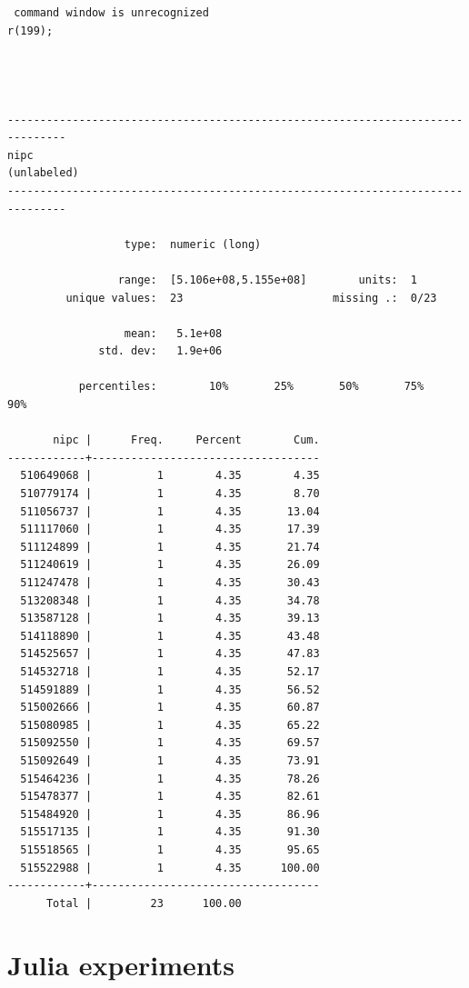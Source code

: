 \documentclass[
  12pt,
]{article}
\begin{document}
\begin{verbatim}
 command window is unrecognized
r(199);




-------------------------------------------------------------------------------
nipc                                                                (unlabeled)
-------------------------------------------------------------------------------

                  type:  numeric (long)

                 range:  [5.106e+08,5.155e+08]        units:  1
         unique values:  23                       missing .:  0/23

                  mean:   5.1e+08
              std. dev:   1.9e+06

           percentiles:        10%       25%       50%       75%       90%

       nipc |      Freq.     Percent        Cum.
------------+-----------------------------------
  510649068 |          1        4.35        4.35
  510779174 |          1        4.35        8.70
  511056737 |          1        4.35       13.04
  511117060 |          1        4.35       17.39
  511124899 |          1        4.35       21.74
  511240619 |          1        4.35       26.09
  511247478 |          1        4.35       30.43
  513208348 |          1        4.35       34.78
  513587128 |          1        4.35       39.13
  514118890 |          1        4.35       43.48
  514525657 |          1        4.35       47.83
  514532718 |          1        4.35       52.17
  514591889 |          1        4.35       56.52
  515002666 |          1        4.35       60.87
  515080985 |          1        4.35       65.22
  515092550 |          1        4.35       69.57
  515092649 |          1        4.35       73.91
  515464236 |          1        4.35       78.26
  515478377 |          1        4.35       82.61
  515484920 |          1        4.35       86.96
  515517135 |          1        4.35       91.30
  515518565 |          1        4.35       95.65
  515522988 |          1        4.35      100.00
------------+-----------------------------------
      Total |         23      100.00
\end{verbatim}

\hypertarget{julia-experiments}{%
\section{Julia experiments}\label{julia-experiments}}
\end{document}
